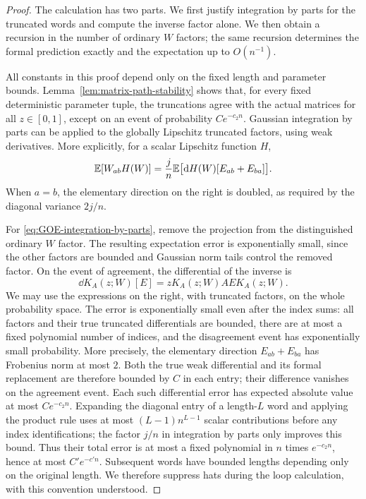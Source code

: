\begin{proof}
The calculation has two parts.  We first justify integration by
parts for the truncated words and compute the inverse factor
alone.  We then obtain a recursion in the number of ordinary
$W$ factors; the same recursion determines the formal
prediction exactly and the expectation up to $O(n^{-1})$.

All constants in this proof depend only on the fixed length and
parameter bounds.  Lemma~\ref{lem:matrix-path-stability} shows that,
for every fixed deterministic parameter tuple, the truncations
agree with the actual matrices for all $z\in[0,1]$, except on an
event of probability $Ce^{-c_2n}$.  Gaussian integration by parts
can be applied to the globally Lipschitz truncated factors, using
weak derivatives.  More explicitly, for a scalar Lipschitz
function $H$,
\begin{equation}\label{eq:GOE-integration-by-parts}
 \mathbb E[W_{ab}H(W)]
 =\frac jn\mathbb E\bigl[\mathrm d H(W)[E_{ab}+E_{ba}]\bigr].
\end{equation}
When $a=b$, the elementary direction on the right is doubled,
as required by the diagonal variance $2j/n$.

For \eqref{eq:GOE-integration-by-parts}, remove the projection
from the distinguished ordinary $W$ factor.  The resulting
expectation error is exponentially small, since the other factors
are bounded and Gaussian norm tails control the removed factor.
On the event of agreement, the differential of the inverse is
\begin{equation}\label{eq:inverse-differential}
 \dd K_A(z;W)[E]=zK_A(z;W)AEK_A(z;W).
\end{equation}
We may use the expressions on the right, with truncated factors,
on the whole probability space.  The error is exponentially small
even after the index sums: all factors and their true truncated
differentials are bounded, there are at most a fixed polynomial
number of indices, and the disagreement event has exponentially
small probability.  More precisely, the elementary direction
$E_{ab}+E_{ba}$ has Frobenius norm at most $2$.  Both the true weak
differential and its formal replacement are therefore bounded by
$C$ in each entry; their difference vanishes on the agreement event.
Each such differential error has expected absolute value at most
$Ce^{-c_2n}$.  Expanding the diagonal entry of a length-$L$ word and
applying the product rule uses at most
$(L-1)n^{L-1}$ scalar contributions before any index identifications;
the factor $j/n$ in integration by parts only improves this bound.
Thus their total error is at most a fixed polynomial in $n$ times
$e^{-c_2n}$, hence at most $C'e^{-c'n}$.  Subsequent words have
bounded lengths depending only on the original length.  We
therefore suppress hats during the loop calculation, with this
convention understood.


\end{proof}

